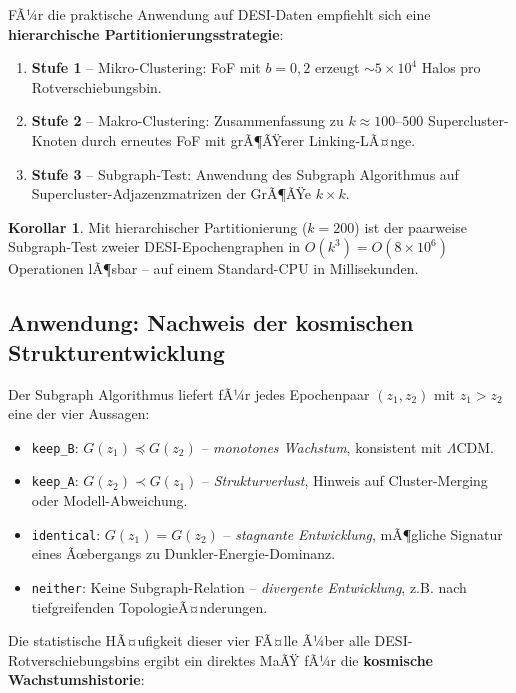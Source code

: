﻿\documentclass[a4paper,12pt]{article}
\theoremstyle{definition}
\newtheorem{korollar}{Korollar}[section]
\theoremstyle{remark}
\begin{document}
FÃ¼r die praktische Anwendung auf DESI-Daten empfiehlt sich eine
\textbf{hierarchische Partitionierungsstrategie}:

\begin{enumerate}[label=\arabic*.]
  \item \textbf{Stufe 1} -- Mikro-Clustering: FoF mit $b=0{,}2$ erzeugt
    $\sim 5 \times 10^4$ Halos pro Rotverschiebungsbin.
  \item \textbf{Stufe 2} -- Makro-Clustering: Zusammenfassung zu
    $k \approx 100$--$500$ Supercluster-Knoten durch erneutes FoF
    mit grÃ¶ÃŸerer Linking-LÃ¤nge.
  \item \textbf{Stufe 3} -- Subgraph-Test: Anwendung des Subgraph Algorithmus
    auf Supercluster-Adjazenzmatrizen der GrÃ¶ÃŸe $k \times k$.
\end{enumerate}

\begin{korollar}
  Mit hierarchischer Partitionierung ($k = 200$) ist der paarweise Subgraph-Test
  zweier DESI-Epochengraphen in $O(k^3) = O(8 \times 10^6)$ Operationen
  lÃ¶sbar -- auf einem Standard-CPU in Millisekunden.
\end{korollar}

\subsection{Anwendung: Nachweis der kosmischen Strukturentwicklung}

Der Subgraph Algorithmus liefert fÃ¼r jedes Epochenpaar $(z_1, z_2)$ mit
$z_1 > z_2$ eine der vier Aussagen:

\begin{itemize}
  \item \texttt{keep\_B}: $G(z_1) \preceq G(z_2)$ -- \textit{monotones Wachstum},
    konsistent mit $\Lambda$CDM.
  \item \texttt{keep\_A}: $G(z_2) \prec G(z_1)$ -- \textit{Strukturverlust},
    Hinweis auf Cluster-Merging oder Modell-Abweichung.
  \item \texttt{identical}: $G(z_1) = G(z_2)$ -- \textit{stagnante Entwicklung},
    mÃ¶gliche Signatur eines Ãœbergangs zu Dunkler-Energie-Dominanz.
  \item \texttt{neither}: Keine Subgraph-Relation -- \textit{divergente Entwicklung},
    z.B. nach tiefgreifenden TopologieÃ¤nderungen.
\end{itemize}

Die statistische HÃ¤ufigkeit dieser vier FÃ¤lle Ã¼ber alle DESI-Rotverschiebungsbins
ergibt ein direktes MaÃŸ fÃ¼r die \textbf{kosmische Wachstumshistorie}:
\end{document}
